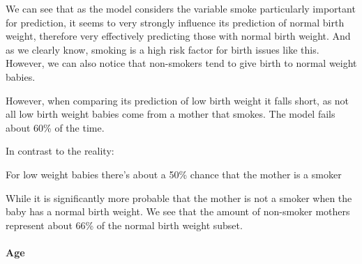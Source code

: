 \documentclass[]{article}
\newenvironment{Shaded}{\begin{snugshade}}{\end{snugshade}}
\newcommand{\CommentTok}[1]{\textcolor[rgb]{0.56,0.35,0.01}{\textit{#1}}}
\newcommand{\KeywordTok}[1]{\textcolor[rgb]{0.13,0.29,0.53}{\textbf{#1}}}
\newcommand{\NormalTok}[1]{#1}
\newcommand{\OperatorTok}[1]{\textcolor[rgb]{0.81,0.36,0.00}{\textbf{#1}}}
\let\oldparagraph\paragraph
\renewcommand{\paragraph}[1]{\oldparagraph{#1}\mbox{}}
\begin{document}
We can see that as the model considers the variable smoke particularly
important for prediction, it seems to very strongly influence its
prediction of normal birth weight, therefore very effectively predicting
those with normal birth weight. And as we clearly know, smoking is a
high risk factor for birth issues like this. However, we can also notice
that non-smokers tend to give birth to normal weight babies.

\begin{Shaded}
\end{Shaded}

However, when comparing its prediction of low birth weight it falls
short, as not all low birth weight babies come from a mother that
smokes. The model fails about 60\% of the time.

In contrast to the reality:

\begin{Shaded}
\end{Shaded}

For low weight babies there's about a 50\% chance that the mother is a
smoker

\begin{Shaded}
\end{Shaded}

While it is significantly more probable that the mother is not a smoker
when the baby has a normal birth weight. We see that the amount of
non-smoker mothers represent about 66\% of the normal birth weight
subset.

\newpage

\hypertarget{age}{%
\paragraph{Age}\label{age}}
\end{document}
